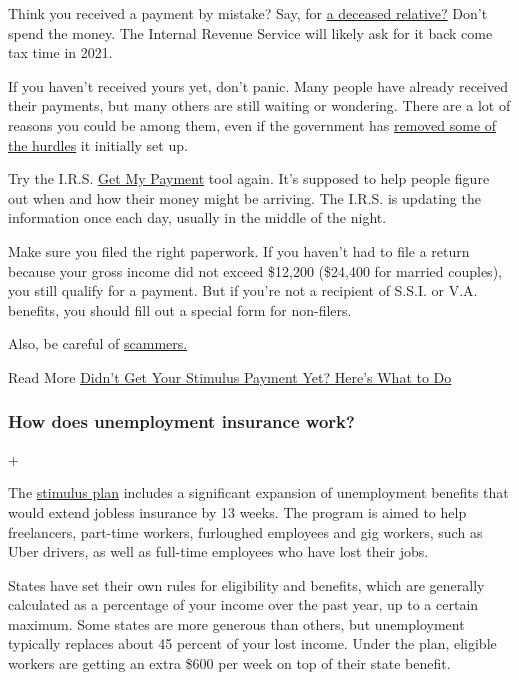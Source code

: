 Think you received a payment by mistake? Say, for
\href{https://www.nytimes.com/2020/06/25/us/politics/coronavirus-stimulus-dead-people.html}{a
deceased relative?} Don't spend the money. The Internal Revenue Service
will likely ask for it back come tax time in 2021.

If you haven't received yours yet, don't panic. Many people have already
received their payments, but many others are still waiting or wondering.
There are a lot of reasons you could be among them, even if the
government has
\href{https://www.nytimes.com/2020/04/01/business/coronavirus-stimulus-social-security.html}{removed
some of the hurdles} it initially set up.

Try the I.R.S. \href{https://www.irs.gov/coronavirus/get-my-payment}{Get
My Payment} tool again. It's supposed to help people figure out when and
how their money might be arriving. The I.R.S. is updating the
information once each day, usually in the middle of the night.

Make sure you filed the right paperwork. If you haven't had to file a
return because your gross income did not exceed \$12,200 (\$24,400 for
married couples), you still qualify for a payment. But if you're not a
recipient of S.S.I. or V.A. benefits, you should fill out a special form
for non-filers.

Also, be careful of
\href{https://www.nytimes.com/2020/04/22/technology/stimulus-checks-hackers-coronavirus.html}{scammers.}

 Read More
\href{https://www.nytimes.com/article/where-is-my-stimulus-payment.html}{Didn't
Get Your Stimulus Payment Yet? Here's What to Do}

\hypertarget{how-does-unemployment-insurance-work}{%
\subsubsection{How does unemployment insurance
work?}\label{how-does-unemployment-insurance-work}}

+

The
\href{https://www.nytimes.com/2020/03/25/us/politics/whats-in-coronavirus-stimulus-bill.html}{stimulus
plan} includes a significant expansion of unemployment benefits that
would extend jobless insurance by 13 weeks. The program is aimed to help
freelancers, part-time workers, furloughed employees and gig workers,
such as Uber drivers, as well as full-time employees who have lost their
jobs.

States have set their own rules for eligibility and benefits, which are
generally calculated as a percentage of your income over the past year,
up to a certain maximum. Some states are more generous than others, but
unemployment typically replaces about 45 percent of your lost income.
Under the plan, eligible workers are getting an extra \$600 per week on
top of their state benefit.

